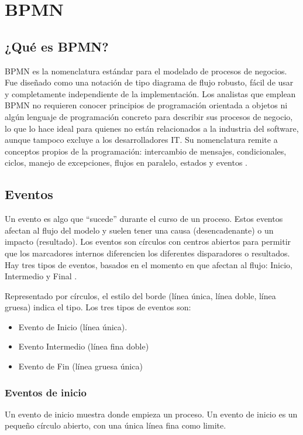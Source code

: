 \section{BPMN}\label{ch:BPMN}

\subsection{¿Qué es BPMN?}
BPMN es la nomenclatura estándar para el modelado de procesos de negocios. Fue diseñado como una notación de tipo diagrama de flujo robusto, fácil de usar y completamente independiente de la implementación. Los analistas que emplean BPMN no requieren conocer principios de programación orientada a objetos ni algún lenguaje de programación concreto para describir sus procesos de negocio, lo que lo hace ideal para quienes no están relacionados a la industria del software, aunque tampoco excluye a los desarrolladores IT. Su nomenclatura remite a conceptos propios de la programación: intercambio de mensajes, condicionales, ciclos, manejo de excepciones, flujos en paralelo, estados y eventos \citep{lopez2013bpmn}.

\subsection{Eventos}
Un evento es algo que ``sucede'' durante el curso de un proceso. Estos eventos afectan al flujo del modelo y suelen tener una causa (desencadenante) o un impacto (resultado). Los eventos son círculos con centros abiertos para permitir que los marcadores internos diferencien los diferentes disparadores o resultados. Hay tres tipos de eventos, basados en el momento en que afectan al flujo: Inicio, Intermedio y Final \citep{VonRosing2014}.

Representado por círculos, el estilo del borde (línea única, línea doble, línea gruesa) indica el tipo. Los tres tipos de eventos son:

\begin{itemize}
	\item Evento de Inicio (línea única).
	\item Evento Intermedio (línea fina doble)
	\item Evento de Fin (línea gruesa única)
\end{itemize}

\subsubsection{Eventos de inicio}
Un evento de inicio muestra donde empieza un proceso. Un evento de inicio es un pequeño círculo abierto, con una única línea fina como limite.

